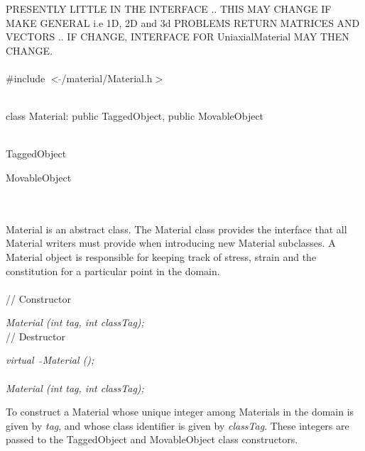 
PRESENTLY LITTLE IN THE INTERFACE .. THIS MAY CHANGE IF MAKE GENERAL
i.e 1D, 2D and 3d PROBLEMS RETURN MATRICES AND VECTORS .. IF CHANGE,
INTERFACE FOR UniaxialMaterial MAY THEN CHANGE. \\ 

   \\
\#include $<\tilde{ }$/material/Material.h$>$  


  \\
class Material: public TaggedObject, public MovableObject 


 \\
TaggedObject 

MovableObject 

\indent{} \\

  \\
\indent Material is an abstract class. The Material class
provides the interface that all Material writers must provide
when introducing new Material subclasses. A Material object
is responsible for keeping track of stress, strain and the
constitution for a particular point in the domain. \\ 

 \\
// Constructor 

{\em Material (int tag, int classTag);}  \\ 

// Destructor 

{\em virtual~ $\tilde{}$Material ();}\\ 


  \\
{\em Material (int tag, int classTag);}  

To construct a Material whose unique integer among Materials in the
domain is given by {\em tag}, and whose class identifier is given
by {\em classTag}. These integers are passed to the TaggedObject and
MovableObject class constructors. \\

 \\
\\ 



